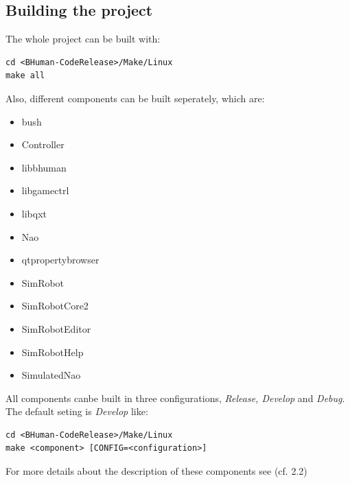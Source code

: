 \documentclass[a4paper]{article}
\begin{document}
\subsection{Building the project}
\label{sec: building the project}
The whole project can be built with:
\begin{lstlisting}
cd <BHuman-CodeRelease>/Make/Linux
make all
\end{lstlisting}
Also, different components can be built seperately, which are:
\begin{itemize}
\item bush
\item Controller
\item libbhuman
\item libgamectrl
\item libqxt
\item Nao
\item qtpropertybrowser
\item SimRobot
\item SimRobotCore2
\item SimRobotEditor
\item SimRobotHelp
\item SimulatedNao
\end{itemize}
All components canbe built in three configurations, \textit{Release, Develop} and \textit{Debug}. The default seting is \textit{Develop} like:
\begin{lstlisting}
cd <BHuman-CodeRelease>/Make/Linux
make <component> [CONFIG=<configuration>]
\end{lstlisting}
For more details about the description of these components  see \cite{BHuman2015}(cf. 2.2)
\clearpage
\end{document}
